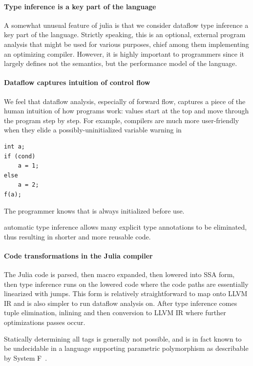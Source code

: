 \documentclass[pldi]{sigplanconf-pldi15}
\begin{document}
\paragraph{Type inference is a key part of the language}
A somewhat unusual feature of julia is that we consider dataflow type inference a
key part of the language. Strictly speaking, this is an optional, external program
analysis that might be used for various purposes, chief among them implementing
an optimizing compiler. However, it is highly important to programmers since it
largely defines not the semantics, but the performance model of the language.

\paragraph{Dataflow captures intuition of control flow}
We feel that dataflow analysis, especially of forward flow, captures a piece of
the human intuition of how programs work: values start at the top and move through
the program step by step. For example, compilers are much more user-friendly
when they elide a possibly-uninitialized variable warning in

\begin{verbatim}
int a;
if (cond)
    a = 1;
else
    a = 2;
f(a);
\end{verbatim}

The programmer knows that  is always initialized before use.

automatic type inference allows many
explicit type annotations to be eliminated, thus resulting in shorter and more
reusable code.

\paragraph{Code transformations in the Julia compiler}
The Julia code is parsed, then macro expanded, then lowered into SSA form, then
type inference runs on the lowered code where the code paths are essentially
linearized with jumps. This form is relatively straightforward to map onto LLVM
IR and is also simpler to run dataflow analysis on. After type inference comes
tuple elimination, inlining and then conversion to LLVM IR where further
optimizations passes occur.

Statically determining all tags is generally not possible, and is in fact known
to be undecidable in a language supporting parametric polymorphism as
describable by System F~\cite{Wells1999}.
\end{document}
